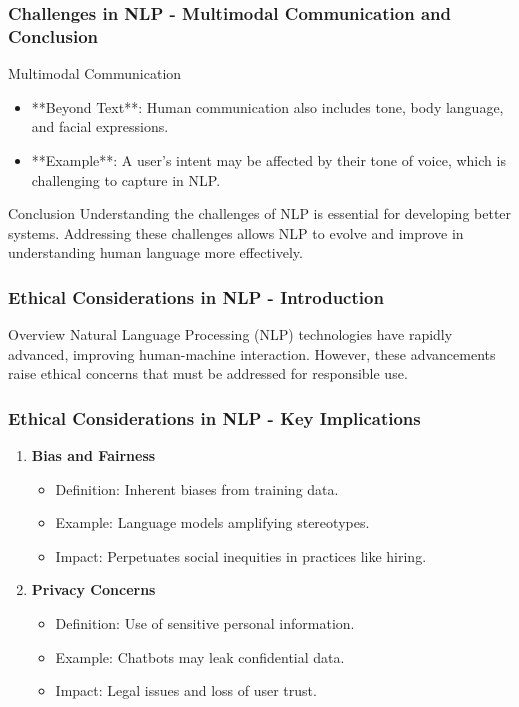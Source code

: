 \documentclass{beamer}
\begin{document}
\begin{frame}[fragile]
    \frametitle{Challenges in NLP - Multimodal Communication and Conclusion}
    \begin{block}{Multimodal Communication}
        \begin{itemize}
            \item **Beyond Text**: Human communication also includes tone, body language, and facial expressions.
            \item **Example**: A user's intent may be affected by their tone of voice, which is challenging to capture in NLP.
        \end{itemize}
    \end{block}
    
    \begin{block}{Conclusion}
        Understanding the challenges of NLP is essential for developing better systems. Addressing these challenges allows NLP to evolve and improve in understanding human language more effectively.
    \end{block}
\end{frame}

\begin{frame}[fragile]
    \frametitle{Ethical Considerations in NLP - Introduction}
    \begin{block}{Overview}
        Natural Language Processing (NLP) technologies have rapidly advanced, improving human-machine interaction. However, these advancements raise ethical concerns that must be addressed for responsible use.
    \end{block}
\end{frame}

\begin{frame}[fragile]
    \frametitle{Ethical Considerations in NLP - Key Implications}
    \begin{enumerate}
        \item \textbf{Bias and Fairness}
            \begin{itemize}
                \item Definition: Inherent biases from training data.
                \item Example: Language models amplifying stereotypes.
                \item Impact: Perpetuates social inequities in practices like hiring.
            \end{itemize}

        \item \textbf{Privacy Concerns}
            \begin{itemize}
                \item Definition: Use of sensitive personal information.
                \item Example: Chatbots may leak confidential data.
                \item Impact: Legal issues and loss of user trust.
            \end{itemize}
    \end{enumerate}
\end{frame}
\end{document}
